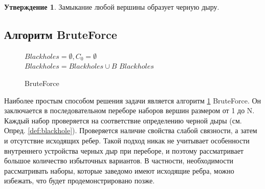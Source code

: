 \documentclass[12pt,a4paper,oneside,openany]{article}
\theoremstyle{definition}
\theoremstyle{lemma}
\newtheorem{lemma}{Утверждение}[]
\theoremstyle{remark}
\begin{document}
\begin{lemma}\label{lemma:closurebh}
	Замыкание любой вершины образует черную дыру.
\end{lemma}

\subsection{Алгоритм BruteForce}\label{subsec:bruteforce}

\linespread{1.0}
\begin{figure}[H]
	\begin{center}
		\begin{algorithm}[H]
			\SetAlgoLined

                        $Blackholes = \emptyset, C_0 = \emptyset$ \\
                         {
                             {
                                 {
                                     {
                                        $Blackholes = Blackholes \cup B$
                                    }
                                }
                            }
                        }
                        \Return $Blackholes$
			\label{alg:bruteforce}
			\caption{BruteForce}
		\end{algorithm}
	\end{center}
\end{figure}
\linespread{1.5}

Наиболее простым способом решения задачи является алгоритм \ref{alg:bruteforce} BruteForce.
Он заключается в последовательном переборе наборов вершин размером от 1 до N.
Каждый набор проверяется на соответствие определению черной дыры (см. Опред. \ref{def:blackhole}).
Проверяется наличие свойства слабой связности, а затем и отсутствие исходящих ребер.
Такой подход никак не учитывает особенности внутреннего устройства черных дыр при переборе,
и поэтому рассматривает большое количество избыточных вариантов.
В частности, необходимости рассматривать наборы, которые заведомо имеют исходящие ребра, можно избежать, что будет продемонстрировано позже.
\end{document}
